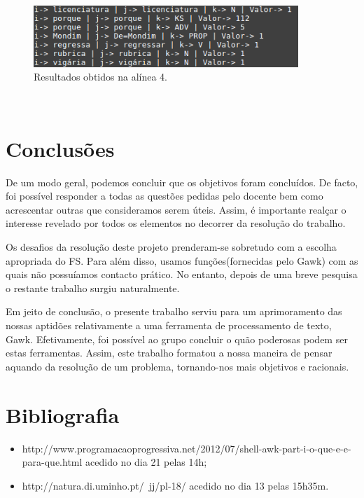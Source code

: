 \documentclass[a4paper]{article}
\begin{document}
\begin{figure}[h!]
  \includegraphics[width=100mm]{resultado4.png} \centering
  \caption{Resultados obtidos na alínea 4.}
  \label{fig:r4}
\end{figure}




\newpage
\mbox{~}
\clearpage
\newpage

\section{Conclusões}
\label{sec:conclusao}
De um modo geral, podemos concluir que os objetivos foram concluídos. De facto, foi possível responder a todas as questões pedidas pelo docente bem como acrescentar outras que consideramos serem úteis. Assim, é importante realçar o interesse revelado por todos os elementos no decorrer da resolução do trabalho.

Os desafios da resolução deste projeto prenderam-se sobretudo com a escolha apropriada do FS. Para além disso, usamos funções(fornecidas pelo Gawk) com as quais não possuíamos contacto prático. No entanto, depois de uma breve pesquisa o restante trabalho surgiu naturalmente. 


Em jeito de conclusão, o presente trabalho serviu para um aprimoramento das nossas aptidões relativamente a uma ferramenta de processamento de texto, Gawk. Efetivamente, foi possível ao grupo concluir o quão poderosas podem ser estas ferramentas. Assim, este trabalho formatou a nossa maneira de pensar aquando da resolução de um problema, tornando-nos mais objetivos e racionais.


\newpage

\section{Bibliografia}
\label{sec:bibliografia}

\begin{itemize}
\item http://www.programacaoprogressiva.net/2012/07/shell-awk-part-i-o-que-e-e-para-que.html acedido no dia 21 pelas 14h;

\item http://natura.di.uminho.pt/~jj/pl-18/ acedido no dia 13 pelas 15h35m.
\end{itemize}
\end{document}
